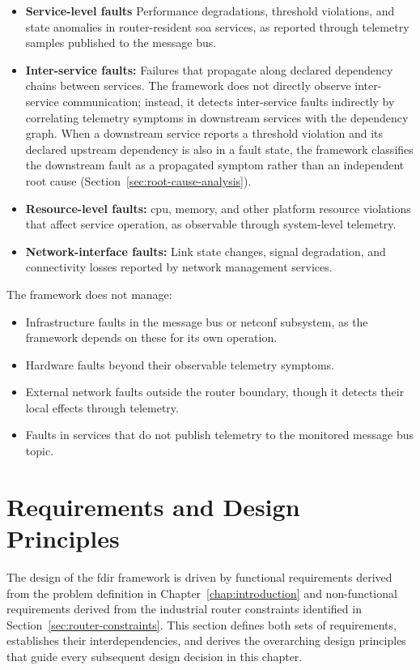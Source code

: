 \begin{itemize}
\item \textbf{Service-level faults} Performance degradations, threshold violations, and state anomalies in router-resident \gls{soa} services, as reported through telemetry samples published to the message bus.
\item \textbf{Inter-service faults:} Failures that propagate along declared dependency chains between services. The framework does not directly observe inter-service communication; instead, it detects inter-service faults indirectly by correlating telemetry symptoms in downstream services with the dependency graph. When a downstream service reports a threshold violation and its declared upstream dependency is also in a fault state, the framework classifies the downstream fault as a propagated symptom rather than an independent root cause (Section~\ref{sec:root-cause-analysis}).
\item \textbf{Resource-level faults:} \gls{cpu}, memory, and other platform resource violations that affect service operation, as observable through system-level telemetry.
\item \textbf{Network-interface faults:} Link state changes, signal degradation, and connectivity losses reported by network management services.
\end{itemize}

The framework does not manage:

\begin{itemize}
\item Infrastructure faults in the message bus or \gls{netconf} subsystem, as the framework depends on these for its own operation.
\item Hardware faults beyond their observable telemetry symptoms.
\item External network faults outside the router boundary, though it detects their local effects through telemetry.
\item Faults in services that do not publish telemetry to the monitored message bus topic.
\end{itemize}

\section{Requirements and Design Principles}\label{sec:requirements-principles}

The design of the \gls{fdir} framework is driven by functional requirements derived from the problem definition in Chapter~\ref{chap:introduction} and non-functional requirements derived from the industrial router constraints identified in Section~\ref{sec:router-constraints}. This section defines both sets of requirements, establishes their interdependencies, and derives the overarching design principles that guide every subsequent design decision in this chapter.

